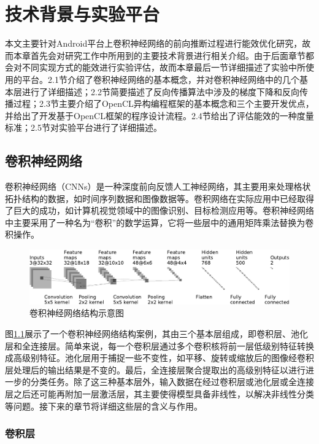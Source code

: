 \chapter{技术背景与实验平台}
本文主要针对Android平台上卷积神经网络的前向推断过程进行能效优化研究，故而本章首先会对研究工作中所用到的主要技术背景进行相关介绍。由于后面章节都会对不同实现方式的能效进行实验评估，故而本章最后一节详细描述了实验中所使用的平台。2.1节介绍了卷积神经网络的基本概念，并对卷积神经网络中的几个基本层进行了详细描述；2.2节简要描述了反向传播算法中涉及的梯度下降和反向传播过程；2.3节主要介绍了OpenCL异构编程框架的基本概念和三个主要开发优点，并给出了开发基于OpenCL框架的程序设计流程。2.4节给出了评估能效的一种度量标准；2.5节对实验平台进行了详细描述。

\section{卷积神经网络}
卷积神经网络（CNNs）是一种深度前向反馈人工神经网络，其主要用来处理格状拓扑结构的数据，如时间序列数据和图像数据等。卷积网络在实际应用中已经取得了巨大的成功，如计算机视觉领域中的图像识别、目标检测应用等。卷积神经网络中主要采用了一种名为“卷积”的数学运算，它将一些层中的通用矩阵乘法替换为卷积操作。

\begin{figure}[htbp]
    \includegraphics[width=1\textwidth]{figures/convnet_fig_cropped.pdf}
    \caption{卷积神经网络结构示意图 \cite{github.com}}\label{figure:figure1}
\end{figure}

图\ref{figure:figure1}展示了一个卷积神经网络结构案例，其由三个基本层组成，即卷积层、池化层和全连接层。简单来说，每一个卷积层通过多个卷积核将前一层低级别特征转换成高级别特征。池化层用于捕捉一些不变性，如平移、旋转或缩放后的图像经卷积层处理后的输出结果是不变的。最后，全连接层聚合提取出的高级别特征以进行进一步的分类任务。除了这三种基本层外，输入数据在经过卷积层或池化层或全连接层之后还可能再附加一层激活层，其主要使得模型具备非线性，以解决非线性分类等问题。接下来的章节将详细这些层的含义与作用。

\subsection{卷积层}
